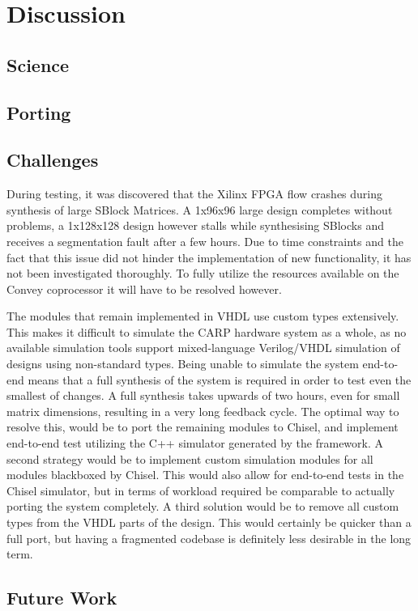 \chapter{Discussion}

\section{Science}

\section{Porting}





\section{Challenges}

During testing, it was discovered that the Xilinx FPGA flow crashes during
synthesis of large SBlock Matrices. A 1x96x96 large design completes without
problems, a 1x128x128 design however stalls while synthesising SBlocks and
receives a segmentation fault after a few hours. Due to time constraints and the
fact that this issue did not hinder the implementation of new functionality, it
has not been investigated thoroughly. To fully utilize the resources available on the
Convey coprocessor it will have to be resolved however.

The modules that remain implemented in VHDL use custom types extensively. This
makes it difficult to simulate the CARP hardware system as a whole, as no
available simulation tools support mixed-language Verilog/VHDL simulation of
designs using non-standard types. Being unable to simulate the system end-to-end
means that a full synthesis of the system is required in order to test even the
smallest of changes. A full synthesis takes upwards of two hours, even for small
matrix dimensions, resulting in a very long feedback cycle. The optimal way to
resolve this, would be to port the remaining modules to Chisel, and implement
end-to-end test utilizing the C++ simulator generated by the framework. A second
strategy would be to implement custom simulation modules for all modules
blackboxed by Chisel. This would also allow for end-to-end tests in the Chisel
simulator, but in terms of workload required be comparable to actually porting
the system completely. A third solution would be to remove all custom types from
the VHDL parts of the design. This would certainly be quicker than a full port,
but having a fragmented codebase is definitely less desirable in the long term.

\section{Future Work}



\cleardoublepage